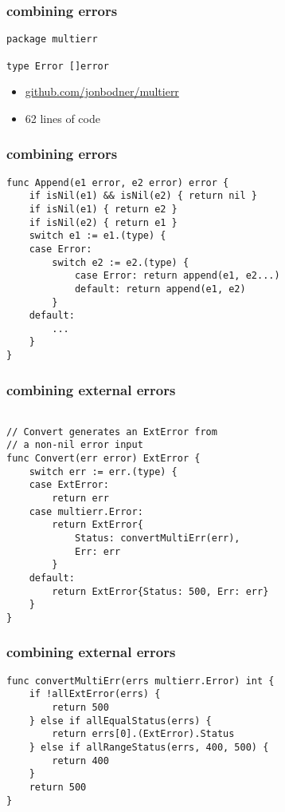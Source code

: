 \documentclass{beamer}
\begin{document}
\begin{frame}[fragile]
\frametitle{combining errors}
\begin{lstlisting}[basicstyle=\ttfamily\footnotesize]
package multierr

type Error []error

\end{lstlisting}
\begin{itemize}
\item \href{https://github.com/jonbodner/multierr}{github.com/jonbodner/multierr}
\item 62 lines of code
\end{itemize}	
\end{frame}

\begin{frame}[fragile]
\frametitle{combining errors}
\begin{lstlisting}[basicstyle=\ttfamily\footnotesize]	
func Append(e1 error, e2 error) error {
	if isNil(e1) && isNil(e2) { return nil }
	if isNil(e1) { return e2 }
	if isNil(e2) { return e1 }
	switch e1 := e1.(type) {
	case Error:
		switch e2 := e2.(type) {
			case Error: return append(e1, e2...)
			default: return append(e1, e2)
		}
	default:
		...
	}
}
\end{lstlisting}
\end{frame}

\begin{frame}[fragile]
\frametitle{combining external errors}
\begin{lstlisting}[basicstyle=\ttfamily\footnotesize]

// Convert generates an ExtError from
// a non-nil error input
func Convert(err error) ExtError {
	switch err := err.(type) {
	case ExtError:
		return err
	case multierr.Error:
		return ExtError{
			Status: convertMultiErr(err),
			Err: err
		}
	default:
		return ExtError{Status: 500, Err: err}
	}
}
\end{lstlisting}
\end{frame}

\begin{frame}[fragile]
\frametitle{combining external errors}
\begin{lstlisting}[basicstyle=\ttfamily\footnotesize]
func convertMultiErr(errs multierr.Error) int {
	if !allExtError(errs) {
		return 500
	} else if allEqualStatus(errs) {
		return errs[0].(ExtError).Status
	} else if allRangeStatus(errs, 400, 500) {
		return 400
	}
	return 500
}
\end{lstlisting}
\end{frame}
\end{document}
